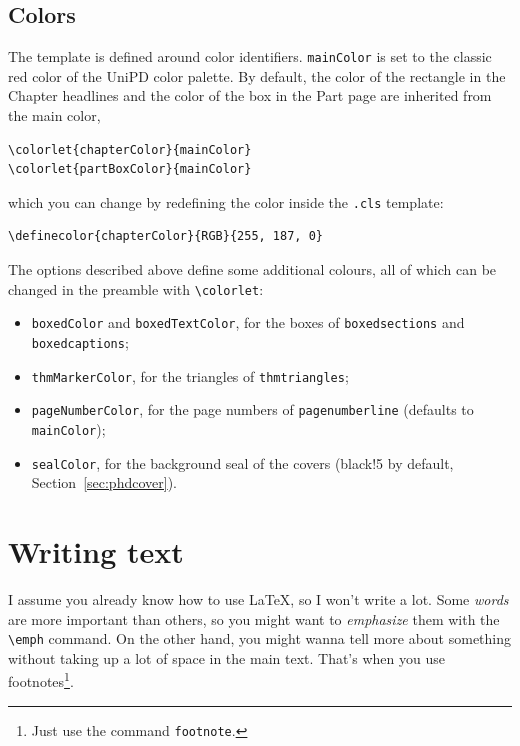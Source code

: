 \subsection{Colors}\label{sec:color}

The template is defined around color identifiers. \texttt{mainColor} is set to the classic red color of the UniPD color palette.
By default, the color of the rectangle in the Chapter headlines and the color of the box in the Part page are inherited from the main color,
\begin{lstlisting}[language={[latex]TeX}]
\colorlet{chapterColor}{mainColor}
\colorlet{partBoxColor}{mainColor}
\end{lstlisting}
which you can change by redefining the color inside the \texttt{.cls} template:
\begin{lstlisting}[language={[latex]TeX}]
\definecolor{chapterColor}{RGB}{255, 187, 0}
\end{lstlisting}

The options described above define some additional colours, all of which can be changed in the preamble with \verb|\colorlet|:
\begin{itemize}
    \item \texttt{boxedColor} and \texttt{boxedTextColor}, for the boxes of \texttt{boxedsections} and \texttt{boxedcaptions};
    \item \texttt{thmMarkerColor}, for the triangles of \texttt{thmtriangles};
    \item \texttt{pageNumberColor}, for the page numbers of \texttt{pagenumberline} (defaults to \texttt{mainColor});
    \item \texttt{sealColor}, for the background seal of the covers (black!5 by default, Section~\ref{sec:phdcover}).
\end{itemize}




\section{Writing text}\label{sec:text}

I assume you already know how to use \LaTeX, so I won't write a lot.
Some \emph{words} are more important than others, so you might want to \emph{emphasize} them with the \verb|\emph| command.
On the other hand, you might wanna tell more about something without taking up a lot of space in the main text.
That's when you use footnotes\footnote{Just use the command \texttt{footnote}.}.

